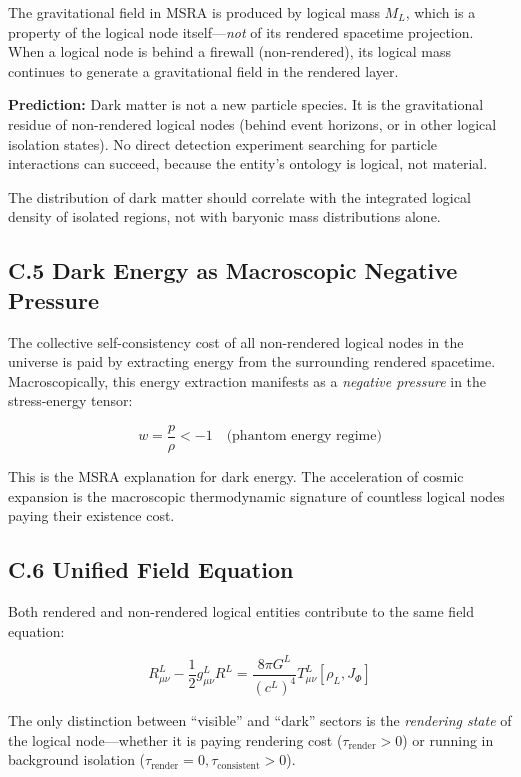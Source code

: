 \documentclass[11pt,a4paper]{article}
\begin{document}
The gravitational field in MSRA is produced by logical mass $M_L$, which is a property of the logical node itself—\textit{not} of its rendered spacetime projection. When a logical node is behind a firewall (non-rendered), its logical mass continues to generate a gravitational field in the rendered layer.

\textbf{Prediction:} Dark matter is not a new particle species. It is the gravitational residue of non-rendered logical nodes (behind event horizons, or in other logical isolation states). No direct detection experiment searching for particle interactions can succeed, because the entity's ontology is logical, not material.

The distribution of dark matter should correlate with the integrated logical density of isolated regions, not with baryonic mass distributions alone.

\subsection*{C.5 Dark Energy as Macroscopic Negative Pressure}

The collective self-consistency cost of all non-rendered logical nodes in the universe is paid by extracting energy from the surrounding rendered spacetime. Macroscopically, this energy extraction manifests as a \textit{negative pressure} in the stress-energy tensor:

\begin{equation}
w = \frac{p}{\rho} < -1 \quad \text{(phantom energy regime)}
\end{equation}

This is the MSRA explanation for dark energy. The acceleration of cosmic expansion is the macroscopic thermodynamic signature of countless logical nodes paying their existence cost.

\subsection*{C.6 Unified Field Equation}

Both rendered and non-rendered logical entities contribute to the same field equation:

\begin{equation}
R^L_{\mu\nu} - \frac{1}{2} g^L_{\mu\nu} R^L = \frac{8\pi G^L}{(c^L)^4} T^L_{\mu\nu}[\rho_L, J_\Phi]
\end{equation}

The only distinction between ``visible'' and ``dark'' sectors is the \textit{rendering state} of the logical node—whether it is paying rendering cost ($\tau_{\text{render}} > 0$) or running in background isolation ($\tau_{\text{render}} = 0, \tau_{\text{consistent}} > 0$).
\end{document}
